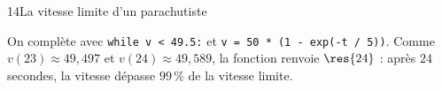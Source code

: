 \begin{corrige}{14}{La vitesse limite d'un parachutiste}
\begin{questions}[start=5]
  \item On complète avec \lstinline[style=otPython]!while v < 49.5:! et \lstinline[style=otPython]!v = 50 * (1 - exp(-t / 5))!.
    Comme $v(23)\approx49{,}497$ et $v(24)\approx49{,}589$, la fonction renvoie $\res{24}$ : après $24$ secondes,
    la vitesse dépasse $99\,\%$ de la vitesse limite.
\end{questions}
\end{corrige}
